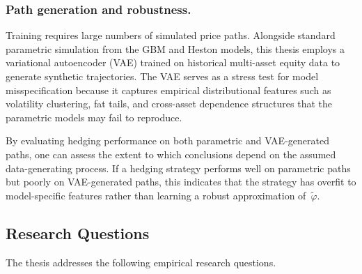 \subsubsection{Path generation and robustness.}

Training requires large numbers of simulated price paths. Alongside standard parametric simulation from the GBM and Heston models, this thesis employs a variational autoencoder (VAE) trained on historical multi-asset equity data to generate synthetic trajectories. The VAE serves as a stress test for model misspecification because it captures empirical distributional features such as volatility clustering, fat tails, and cross-asset dependence structures that the parametric models may fail to reproduce.

By evaluating hedging performance on both parametric and VAE-generated paths, one can assess the extent to which conclusions depend on the assumed data-generating process. If a hedging strategy performs well on parametric paths but poorly on VAE-generated paths, this indicates that the strategy has overfit to model-specific features rather than learning a robust approximation of~$\tilde{\varphi}$.


\subsection{Research Questions}
\label{subsec:research_questions}

The thesis addresses the following empirical research questions.

